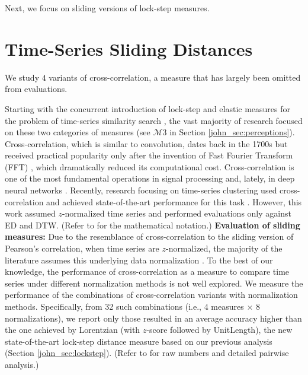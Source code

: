 \documentclass[11pt]{article}
\begin{document}
Next, we focus on sliding versions of lock-step measures. 
\vspace*{-0.1cm}
\section{Time-Series Sliding Distances}
\label{john_sec:sliding}

We study $4$ variants of cross-correlation, a measure that has largely been omitted from evaluations. 

Starting with the concurrent introduction of lock-step and elastic measures for the problem of time-series similarity search \cite{agrawal1993,Faloutsos1994fast,berndt1994using}, the vast majority of research focused on these two categories of measures (see $\mathcal{M}3$ in Section \ref{john_sec:perceptions}). Cross-correlation, which is similar to convolution, dates back in the 1700s \cite{dominguez2015history} but received practical popularity only after the invention of Fast Fourier Transform (FFT) \cite{cooley1965algorithm}, which dramatically reduced its computational cost. Cross-correlation is one of the most fundamental operations in signal processing \cite{brown1992survey} and, lately, in deep neural networks \cite{lecun1995convolutional,lecun2015deep}. Recently, research focusing on time-series clustering used cross-correlation and achieved state-of-the-art performance for this task \cite{paparrizos2015k,paparrizos2017fast}. However, this work assumed $z$-normalized time series and performed evaluations only against ED and DTW. (Refer to \cite{paparrizos2015k,paparrizos2020debunking} for the mathematical notation.)
\newline \textbf{Evaluation of sliding measures: } Due to the resemblance of cross-correlation to the sliding version of Pearson's correlation, when time series are $z$-normalized, the majority of the literature assumes this underlying data normalization \cite{paparrizos2015k}. To the best of our knowledge, the performance of cross-correlation as a measure to compare time series under different normalization methods is not well explored. We measure the performance of the combinations of cross-correlation variants with normalization methods. Specifically, from 32 such combinations (i.e., $4$ measures $\times$ $8$ normalizations), we report only those resulted in an average accuracy higher than the one achieved by Lorentzian (with $z$-score followed by UnitLength), the new state-of-the-art lock-step distance measure based on our previous analysis (Section \ref{john_sec:lockstep}). (Refer to \cite{paparrizos2020debunking} for raw numbers and detailed pairwise analysis.)
\end{document}
